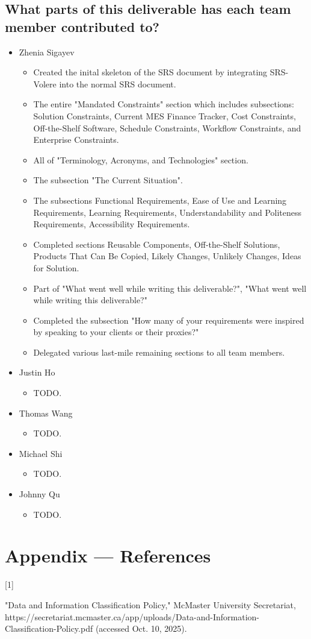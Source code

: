 \documentclass[12pt]{article}
\begin{document}
  \subsection{What parts of this deliverable has each team member contributed to?}
  \begin{itemize}
    \item Zhenia Sigayev
      \begin{itemize}[label=$\circ$]
        \item Created the inital skeleton of the SRS document by integrating SRS-Volere into the normal SRS document.
        \item The entire "Mandated Constraints" section which includes subsections: Solution Constraints, Current MES Finance Tracker, Cost Constraints, Off-the-Shelf Software, Schedule Constraints, Workflow Constraints, and Enterprise Constraints.
        \item All of "Terminology, Acronyms, and Technologies" section.
        \item The subsection "The Current Situation".
        \item The subsections Functional Requirements, Ease of Use and Learning Requirements, Learning Requirements, Understandability and Politeness Requirements, Accessibility Requirements.
        \item Completed sections Reusable Components, Off-the-Shelf Solutions, Products That Can Be Copied, Likely Changes, Unlikely Changes, Ideas for Solution.
        \item Part of "What went well while writing this deliverable?", "What went well while writing this deliverable?"
        \item Completed the subsection "How many of your requirements were inspired by speaking to your clients or their proxies?"
        \item Delegated various last-mile remaining sections to all team members.
      \end{itemize}
    \item Justin Ho
      \begin{itemize}[label=$\circ$]
        \item TODO.
      \end{itemize}
    \item Thomas Wang
      \begin{itemize}[label=$\circ$]
        \item TODO.
      \end{itemize}
    \item Michael Shi
      \begin{itemize}[label=$\circ$]
        \item TODO.
      \end{itemize}
    \item Johnny Qu
      \begin{itemize}[label=$\circ$]
        \item TODO.
      \end{itemize}
  \end{itemize}

\section*{Appendix --- References}
  \hypertarget{Ref1}{[1]} "Data and Information Classification Policy," McMaster University Secretariat, https://secretariat.mcmaster.ca/app/uploads/Data-and-Information-Classification-Policy.pdf (accessed Oct. 10, 2025). \\
\end{document}
